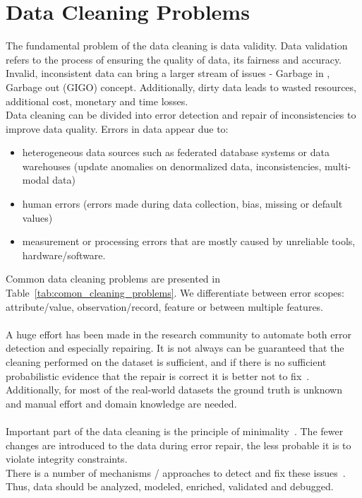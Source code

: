 \section{Data Cleaning Problems}
The fundamental problem of the data cleaning is data validity. Data validation refers to the process of ensuring the quality of data, its fairness and accuracy. 
Invalid, inconsistent data can bring a larger stream of issues - Garbage in , Garbage out (GIGO) concept.
Additionally, dirty data leads to wasted resources, additional cost, monetary and time losses.
\\Data cleaning can be divided into error detection and repair of inconsistencies to improve data quality.
Errors in data appear due to:
\begin{itemize}
    \item heterogeneous data sources such as federated database systems or data warehouses (update anomalies on denormalized data, inconsistencies, multi-modal data)
    \item human errors (errors made during data collection, bias, missing or default values) 
    \item measurement or processing errors that are mostly caused by unreliable tools, hardware/software.
\end{itemize}
Common data cleaning problems are presented in Table~\ref{tab:comon_cleaning_problems}. We differentiate between error scopes: attribute/value, observation/record, feature or between multiple features. 
\\\\
A huge effort has been made in the research community to automate both error detection and especially repairing. 
It is not always can be guaranteed that the cleaning performed on the dataset is sufficient, and if there is no sufficient probabilistic evidence that the repair is correct it is better not to fix~\cite{holoclean}. 
Additionally, for most of the real-world datasets the ground truth is unknown and manual effort and domain knowledge are needed.
\\\\
Important part of the data cleaning is the principle of minimality~\cite{minimality, holoclean}. The fewer changes are introduced to the data during error repair, the less probable it is to violate integrity constraints.
\\There is a number of mechanisms / approaches to detect and fix these issues~\cite{data_cleaning_methods}. Thus, data should be analyzed, modeled, enriched, validated and debugged.


